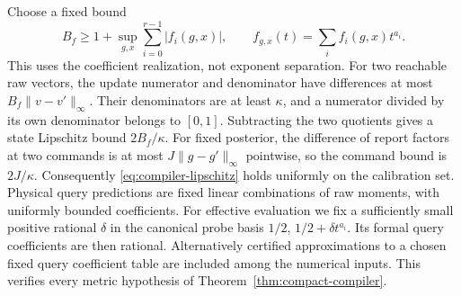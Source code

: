 \documentclass[11pt]{amsart}
\theoremstyle{definition}\newtheorem{definition}[theorem]{Definition}
\theoremstyle{remark}\newtheorem{remark}[theorem]{Remark}
\begin{document}
Choose a fixed bound
\[
 B_f\ge1+\sup_{g,x}\sum_{i=0}^{r-1}|f_i(g,x)|,
 \qquad f_{g,x}(t)=\sum_i f_i(g,x)t^{a_i}.
\]
This uses the coefficient realization, not exponent separation.
For two reachable raw vectors, the update numerator and denominator
have differences at most $B_f\|v-v'\|_\infty$. Their denominators
are at least $\kappa$, and a numerator divided by its own denominator
belongs to $[0,1]$. Subtracting the two quotients gives a state
Lipschitz bound $2B_f/\kappa$. For fixed posterior, the difference of
report factors at two commands is at most $J\|g-g'\|_\infty$
pointwise, so the command bound is $2J/\kappa$. Consequently
\eqref{eq:compiler-lipschitz} holds uniformly on the calibration set.
Physical query predictions are fixed linear combinations of raw moments,
with uniformly bounded coefficients. For effective evaluation we fix
a sufficiently small positive rational $\delta$ in the canonical
probe basis $1/2$, $1/2+\delta t^{a_i}$. Its formal query coefficients
are then rational. Alternatively certified approximations to a chosen
fixed query coefficient table are included among the numerical inputs.
This verifies every metric
hypothesis of Theorem~\ref{thm:compact-compiler}.
\end{document}
